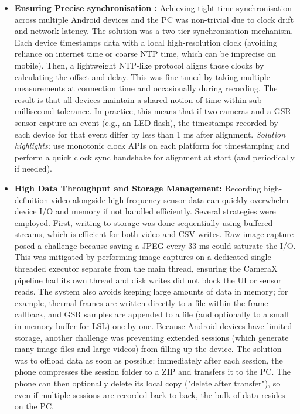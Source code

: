 \begin{itemize}
	\item \textbf{Ensuring Precise synchronisation :} Achieving tight time synchronisation across multiple Android devices and the PC was non-trivial due to clock drift and network latency. The solution was a two-tier synchronisation mechanism. Each device timestamps data with a local high-resolution clock (avoiding reliance on internet time or coarse NTP time, which can be imprecise on mobile). Then, a lightweight NTP-like protocol aligns those clocks by calculating the offset and delay. This was fine-tuned by taking multiple measurements at connection time and occasionally during recording. The result is that all devices maintain a shared notion of time within sub-millisecond tolerance. In practice, this means that if two cameras and a GSR sensor capture an event (e.g., an LED flash), the timestamps recorded by each device for that event differ by less than 1 ms after alignment. \emph{Solution highlights:} use monotonic clock APIs on each platform for timestamping and perform a quick clock sync handshake for alignment at start (and periodically if needed).
	\item \textbf{High Data Throughput and Storage Management:} Recording high-definition video alongside high-frequency sensor data can quickly overwhelm device I/O and memory if not handled efficiently. Several strategies were employed. First, writing to storage was done sequentially using buffered streams, which is efficient for both video and CSV writes. Raw image capture posed a challenge because saving a JPEG every 33 ms could saturate the I/O. This was mitigated by performing image captures on a dedicated single-threaded executor separate from the main thread, ensuring the CameraX pipeline had its own thread and disk writes did not block the UI or sensor reads. The system also avoids keeping large amounts of data in memory; for example, thermal frames are written directly to a file within the frame callback, and GSR samples are appended to a file (and optionally to a small in-memory buffer for LSL) one by one. Because Android devices have limited storage, another challenge was preventing extended sessions (which generate many image files and large videos) from filling up the device. The solution was to offload data as soon as possible: immediately after each session, the phone compresses the session folder to a ZIP and transfers it to the PC. The phone can then optionally delete its local copy ("delete after transfer"), so even if multiple sessions are recorded back-to-back, the bulk of data resides on the PC.

\end{itemize}
